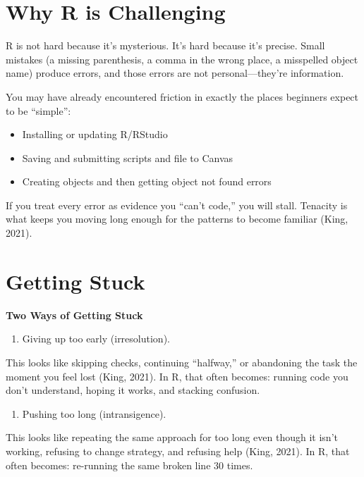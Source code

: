 \documentclass[
  12pt,
]{scrreprt}
\providecommand{\tightlist}{%
  \setlength{\itemsep}{0pt}\setlength{\parskip}{0pt}}
\begin{document}
\section{Why R is Challenging}\label{why-r-is-challenging}

R is not hard because it's mysterious. It's hard because it's precise.
Small mistakes (a missing parenthesis, a comma in the wrong place, a
misspelled object name) produce errors, and those errors are not
personal---they're information.

You may have already encountered friction in exactly the places
beginners expect to be ``simple'':

\begin{itemize}
\item
  Installing or updating R/RStudio
\item
  Saving and submitting scripts and file to Canvas
\item
  Creating objects and then getting object not found errors
\end{itemize}

If you treat every error as evidence you ``can't code,'' you will stall.
Tenacity is what keeps you moving long enough for the patterns to become
familiar (King, 2021).

\section{Getting Stuck}\label{getting-stuck}

\textbf{Two Ways of Getting Stuck}

\begin{enumerate}
\def\labelenumi{\arabic{enumi})}
\tightlist
\item
  Giving up too early (irresolution).
\end{enumerate}

This looks like skipping checks, continuing ``halfway,'' or abandoning
the task the moment you feel lost (King, 2021). In R, that often
becomes: running code you don't understand, hoping it works, and
stacking confusion.

\begin{enumerate}
\def\labelenumi{\arabic{enumi})}
\setcounter{enumi}{1}
\tightlist
\item
  Pushing too long (intransigence).
\end{enumerate}

This looks like repeating the same approach for too long even though it
isn't working, refusing to change strategy, and refusing help (King,
2021). In R, that often becomes: re-running the same broken line 30
times.
\end{document}
